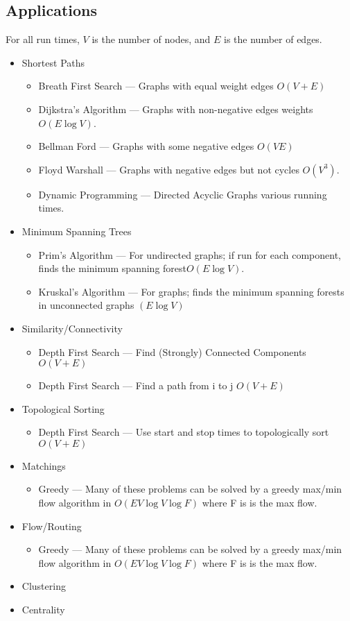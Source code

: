 \subsection{Applications}
For all run times, $V$ is the number of nodes, and $E$ is the number of edges.
\begin{itemize}
	\item Shortest Paths
		\begin{itemize}
			\item Breath First Search --- Graphs with equal weight edges $O(V+E)$
			\item Dijkstra's Algorithm --- Graphs with non-negative edges weights $O(E \log V)$.
			\item Bellman Ford --- Graphs with some negative edges $O(VE)$
			\item Floyd Warshall --- Graphs with negative edges but not cycles $O(V^3)$.
			\item Dynamic Programming --- Directed Acyclic Graphs various running times.
		\end{itemize}
	\item Minimum Spanning Trees 
		\begin{itemize}
			\item Prim's Algorithm --- For undirected graphs; if run for each component, finds the minimum spanning forest$O(E \log V)$.
			\item Kruskal's Algorithm --- For graphs; finds the minimum spanning forests in unconnected graphs $(E \log V)$
		\end{itemize}
	\item Similarity/Connectivity
		\begin{itemize}
			\item Depth First Search --- Find (Strongly) Connected Components $O(V+E)$
			\item Depth First Search --- Find a path from i to j $O(V+E)$
		\end{itemize}
	\item Topological Sorting 
		\begin{itemize}
			\item Depth First Search --- Use start and stop times to topologically sort $O(V+E)$
		\end{itemize}
	\item Matchings
		\begin{itemize}
			\item Greedy --- Many of these problems can be solved by a greedy max/min flow algorithm in $O(EV \log V \log F)$ where F is is the max flow.
		\end{itemize}
	\item Flow/Routing
		\begin{itemize}
			\item Greedy --- Many of these problems can be solved by a greedy max/min flow algorithm in $O(EV \log V \log F)$ where F is is the max flow.
		\end{itemize}
	\item Clustering
	\item Centrality
\end{itemize}

